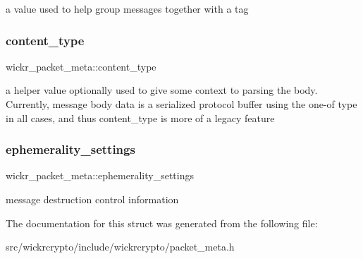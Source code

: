 a value used to help group messages together with a tag \mbox{\label{structwickr__packet__meta_ada659f7c31d257c76edab5db52973f6e}} 
\subsubsection{\texorpdfstring{content\_type}{content\_type}}
{\footnotesize\ttfamily wickr\+\_\+packet\+\_\+meta\+::content\+\_\+type}

a helper value optionally used to give some context to parsing the body. Currently, message body data is a serialized protocol buffer using the one-\/of type in all cases, and thus content\+\_\+type is more of a legacy feature \mbox{\label{structwickr__packet__meta_a0ef43c179038ba036fc9db17976b8b1e}} 
\subsubsection{\texorpdfstring{ephemerality\_settings}{ephemerality\_settings}}
{\footnotesize\ttfamily wickr\+\_\+packet\+\_\+meta\+::ephemerality\+\_\+settings}

message destruction control information 

The documentation for this struct was generated from the following file\+:\begin{DoxyCompactItemize}
\item 
src/wickrcrypto/include/wickrcrypto/packet\+\_\+meta.\+h\end{DoxyCompactItemize}
